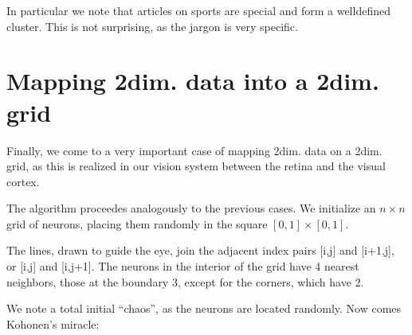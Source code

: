 \documentclass[letterpaper,10pt,english]{jupyterBook}
\begin{document}
\sphinxAtStartPar
In particular we note that articles on sports are special and form a well\sphinxhyphen{}defined cluster. This is not surprising, as the jargon is very specific.


\section{Mapping 2\sphinxhyphen{}dim. data into a 2\sphinxhyphen{}dim. grid}
\label{\detokenize{docs/som:mapping-2-dim-data-into-a-2-dim-grid}}
\sphinxAtStartPar
Finally, we come to a very important case of mapping 2\sphinxhyphen{}dim. data on a 2\sphinxhyphen{}dim. grid, as this is realized in our vision system between the retina and the visual cortex.

\sphinxAtStartPar
The algorithm proceedes analogously to the previous cases. We initialize an \(n \times n\) grid of neurons, placing them randomly in the square \([0,1]\times [0,1]\).

\begin{sphinxVerbatim}[commandchars=\\\{\}]
\PYG{p}{[}    \PYG{p}{]}
\end{sphinxVerbatim}

\sphinxAtStartPar
The lines, drawn to guide the eye, join the adjacent index pairs {[}i,j{]} and {[}i+1,j{]}, or {[}i,j{]} and {[}i,j+1{]}. The neurons in the interior of the grid have 4 nearest neighbors, those at the boundary 3, except for the corners, which have 2.

\noindent{}

\sphinxAtStartPar
We note a total initial “chaos”, as the neurons are located randomly. Now comes Kohonen’s miracle:

\begin{sphinxVerbatim}[commandchars=\\\{\}]
   
     
   
  
    
\end{sphinxVerbatim}
\end{document}
